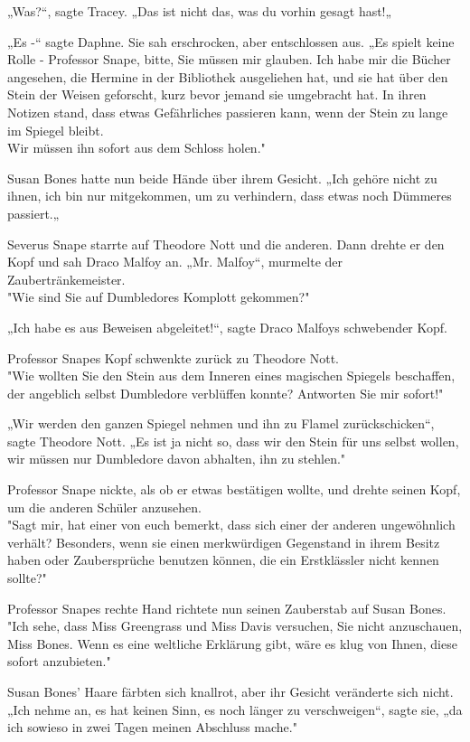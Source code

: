 {„Was?“, sagte Tracey. „Das ist nicht das, was du vorhin gesagt hast!„

„Es -“ sagte Daphne. Sie sah erschrocken, aber entschlossen aus. „Es spielt keine Rolle - Professor Snape, bitte, Sie müssen mir glauben. Ich habe mir die Bücher angesehen, die Hermine in der Bibliothek ausgeliehen hat, und sie hat über den Stein der Weisen geforscht, kurz bevor jemand sie umgebracht hat. In ihren Notizen stand, dass etwas Gefährliches passieren kann, wenn der Stein zu lange im Spiegel bleibt.\\ Wir müssen ihn sofort aus dem Schloss holen."

Susan Bones hatte nun beide Hände über ihrem Gesicht. „Ich gehöre nicht zu ihnen, ich bin nur mitgekommen, um zu verhindern, dass etwas noch Dümmeres passiert.„

Severus Snape starrte auf Theodore Nott und die anderen. Dann drehte er den Kopf und sah Draco Malfoy an. „Mr. Malfoy“, murmelte der Zaubertränkemeister.\\ "Wie sind Sie auf Dumbledores Komplott gekommen?"

„Ich habe es aus Beweisen abgeleitet!“, sagte Draco Malfoys schwebender Kopf.

Professor Snapes Kopf schwenkte zurück zu Theodore Nott.\\ "Wie wollten Sie den Stein aus dem Inneren eines magischen Spiegels beschaffen, der angeblich selbst Dumbledore verblüffen konnte? Antworten Sie mir sofort!"

„Wir werden den ganzen Spiegel nehmen und ihn zu Flamel zurückschicken“, sagte Theodore Nott. „Es ist ja nicht so, dass wir den Stein für uns selbst wollen, wir müssen nur Dumbledore davon abhalten, ihn zu stehlen."

Professor Snape nickte, als ob er etwas bestätigen wollte, und drehte seinen Kopf, um die anderen Schüler anzusehen.\\ "Sagt mir, hat einer von euch bemerkt, dass sich einer der anderen ungewöhnlich verhält? Besonders, wenn sie einen merkwürdigen Gegenstand in ihrem Besitz haben oder Zaubersprüche benutzen können, die ein Erstklässler nicht kennen sollte?"

Professor Snapes rechte Hand richtete nun seinen Zauberstab auf Susan Bones.\\ "Ich sehe, dass Miss Greengrass und Miss Davis versuchen, Sie nicht anzuschauen, Miss Bones. Wenn es eine weltliche Erklärung gibt, wäre es klug von Ihnen, diese sofort anzubieten."

Susan Bones' Haare färbten sich knallrot, aber ihr Gesicht veränderte sich nicht.\\ „Ich nehme an, es hat keinen Sinn, es noch länger zu verschweigen“, sagte sie, „da ich sowieso in zwei Tagen meinen Abschluss mache."

}
